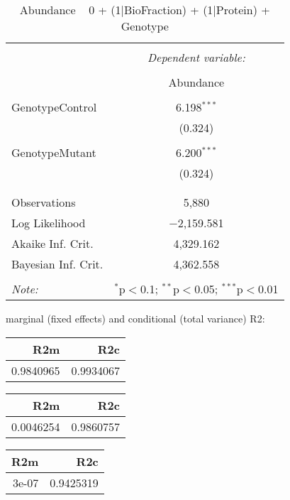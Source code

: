 \documentclass[11pt]{report}
\begin{document}
\begin{table}[!htbp] \centering 
  \caption{Abundance ~ 0 + (1|BioFraction) + (1|Protein) + Genotype} 
  \label{} 
\begin{tabular}{@{\extracolsep{5pt}}lc} 
\\[-1.8ex]\hline 
\hline \\[-1.8ex] 
 & \multicolumn{1}{c}{\textit{Dependent variable:}} \\ 
\cline{2-2} 
\\[-1.8ex] & Abundance \\ 
\hline \\[-1.8ex] 
 GenotypeControl & 6.198$^{***}$ \\ 
  & (0.324) \\ 
  & \\ 
 GenotypeMutant & 6.200$^{***}$ \\ 
  & (0.324) \\ 
  & \\ 
\hline \\[-1.8ex] 
Observations & 5,880 \\ 
Log Likelihood & $-$2,159.581 \\ 
Akaike Inf. Crit. & 4,329.162 \\ 
Bayesian Inf. Crit. & 4,362.558 \\ 
\hline 
\hline \\[-1.8ex] 
\textit{Note:}  & \multicolumn{1}{r}{$^{*}$p$<$0.1; $^{**}$p$<$0.05; $^{***}$p$<$0.01} \\ 
\end{tabular} 
\end{table} 
marginal (fixed effects) and conditional (total variance) R2:

\begin{tabular}{r|r}
\hline
R2m & R2c\\
\hline
0.9840965 & 0.9934067\\
\hline
\end{tabular}

\begin{tabular}{r|r}
\hline
R2m & R2c\\
\hline
0.0046254 & 0.9860757\\
\hline
\end{tabular}

\begin{tabular}{r|r}
\hline
R2m & R2c\\
\hline
3e-07 & 0.9425319\\
\hline
\end{tabular}
\end{document}
